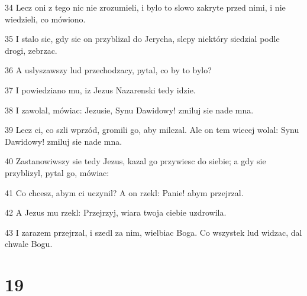 \par 34 Lecz oni z tego nic nie zrozumieli, i bylo to slowo zakryte przed nimi, i nie wiedzieli, co mówiono.
\par 35 I stalo sie, gdy sie on przyblizal do Jerycha, slepy niektóry siedzial podle drogi, zebrzac.
\par 36 A uslyszawszy lud przechodzacy, pytal, co by to bylo?
\par 37 I powiedziano mu, iz Jezus Nazarenski tedy idzie.
\par 38 I zawolal, mówiac: Jezusie, Synu Dawidowy! zmiluj sie nade mna.
\par 39 Lecz ci, co szli wprzód, gromili go, aby milczal. Ale on tem wiecej wolal: Synu Dawidowy! zmiluj sie nade mna.
\par 40 Zastanowiwszy sie tedy Jezus, kazal go przywiesc do siebie; a gdy sie przyblizyl, pytal go, mówiac:
\par 41 Co chcesz, abym ci uczynil? A on rzekl: Panie! abym przejrzal.
\par 42 A Jezus mu rzekl: Przejrzyj, wiara twoja ciebie uzdrowila.
\par 43 I zarazem przejrzal, i szedl za nim, wielbiac Boga. Co wszystek lud widzac, dal chwale Bogu.

\chapter{19}

